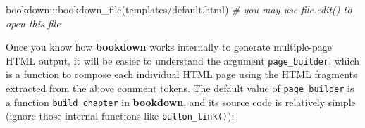 \documentclass[
  12pt,
]{krantz}
\newenvironment{Shaded}{\begin{snugshade}}{\end{snugshade}}
\newcommand{\CommentTok}[1]{\textcolor[rgb]{0.56,0.35,0.01}{\textit{#1}}}
\newcommand{\FunctionTok}[1]{\textcolor[rgb]{0.00,0.00,0.00}{#1}}
\newcommand{\NormalTok}[1]{#1}
\newcommand{\SpecialCharTok}[1]{\textcolor[rgb]{0.00,0.00,0.00}{#1}}
\newcommand{\StringTok}[1]{\textcolor[rgb]{0.31,0.60,0.02}{#1}}
\theoremstyle{definition}
\theoremstyle{definition}
\theoremstyle{definition}
\theoremstyle{definition}
\theoremstyle{remark}
\begin{document}
\begin{Shaded}
\begin{Highlighting}[]
\NormalTok{bookdown}\SpecialCharTok{:::}\FunctionTok{bookdown\_file}\NormalTok{(}\StringTok{\textquotesingle{}templates/default.html\textquotesingle{}}\NormalTok{)}
\CommentTok{\# you may use file.edit() to open this file}
\end{Highlighting}
\end{Shaded}

Once you know how \textbf{bookdown} works internally to generate multiple-page HTML output, it will be easier to understand the argument \texttt{page\_builder}, which is a function to compose each individual HTML page using the HTML fragments extracted from the above comment tokens. The default value of \texttt{page\_builder} is a function \texttt{build\_chapter} in \textbf{bookdown}, and its source code is relatively simple (ignore those internal functions like \texttt{button\_link()}):
\end{document}
